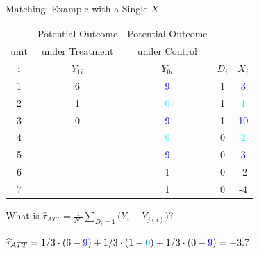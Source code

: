\documentclass[xcolor=dvipsnames]{beamer}
\begin{document}
\begin{frame}{Matching: Example with a Single $X$}

\begin{tabular}{c|c|c|c|c}
 &Potential Outcome & Potential Outcome &   & \\
unit &under Treatment  & under Control &   &  \\

\hline
   i  & $Y_{1i}$  & $Y_{0i}$ &    $D_i$ &  $X_i$ \\
\hline
         1 & \multicolumn{ 1}{c|}{6} & \multicolumn{ 1}{c|}{\textcolor{blue}{9}} &                    1 &          \textcolor{blue}{3} \\
         2 & \multicolumn{ 1}{c|}{1} & \multicolumn{ 1}{c|}{\textcolor{cyan}{0}} &                    1 &          \textcolor{cyan}{1} \\
         3 & \multicolumn{ 1}{c|}{0} & \multicolumn{ 1}{c|}{\textcolor{blue}{9}} &                    1 &          \textcolor{blue}{10} \\
\hline
         4 & \multicolumn{ 1}{c|}{} & \multicolumn{1}{c|}{\textcolor{cyan}{0}} &                    0 &          \textcolor{cyan}{2} \\
         5 & \multicolumn{ 1}{c|}{} & \multicolumn{1}{c|}{\textcolor{blue}{9}} &                    0 &          \textcolor{blue}{3} \\
         6 & \multicolumn{ 1}{c|}{} & \multicolumn{1}{c|}{1} &                    0 &          -2 \\
         7 & \multicolumn{ 1}{c|}{} & \multicolumn{1}{c|}{1} &                    0 &          -4 \\
         \hline
\end{tabular}

What is
$\widehat{\tau}_{ATT}= \frac{1}{N_1} \sum_{D_i=1} \big(Y_i - Y_{j(i)}\big)$?
\pause

$\widehat{\tau}_{ATT}=1/3\cdot(6-\textcolor{blue}{9})+1/3\cdot(1-\textcolor{cyan}{0})+1/3\cdot(0-\textcolor{blue}{9})=-3.7$

\end{frame}
\end{document}
